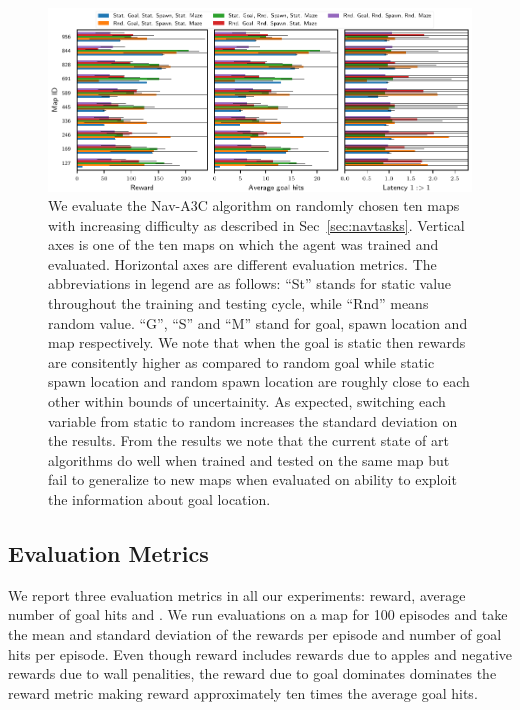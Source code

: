 \begin{figure}%
  \includegraphics[width=\linewidth]{images/plot_summary_bar_plots.pdf}%
  \vspace{-1em}%
  \caption{We evaluate the Nav-A3C\cite{MiPaViICLR2017} algorithm on randomly chosen ten maps with increasing difficulty as described in Sec~\ref{sec:navtasks}.
  Vertical axes is one of the ten maps on which the agent was trained and evaluated.
  Horizontal axes are different evaluation metrics.
  The abbreviations in legend are as follows: ``St'' stands for
  static value throughout the training and testing cycle, while ``Rnd'' means random value. ``G'', ``S'' and ``M'' stand for goal, spawn location and map respectively.
  We note that when the goal is static then rewards are consitently higher as compared to random goal while static spawn location and random spawn location are roughly close to each other within bounds of uncertainity. As expected, switching each variable from static to random increases the standard deviation on the results.
  From the \LatencyOneGtOne{} results we note that the current state of art algorithms do well when trained and tested on the same map but fail to generalize to new maps when evaluated on ability to exploit the information about goal location.}%
\label{fig:latency-goal-reward}%
\end{figure}


\subsection{Evaluation Metrics}
We report three evaluation metrics in all our experiments: reward, average number of goal hits and \LatencyOneGtOne{}. We run evaluations on a map for 100 episodes and take the mean and standard deviation of the rewards per episode and number of goal hits per episode. Even though reward includes rewards due to apples and negative rewards due to wall penalities, the reward due to goal dominates dominates the reward metric making reward approximately ten times the average goal hits.

